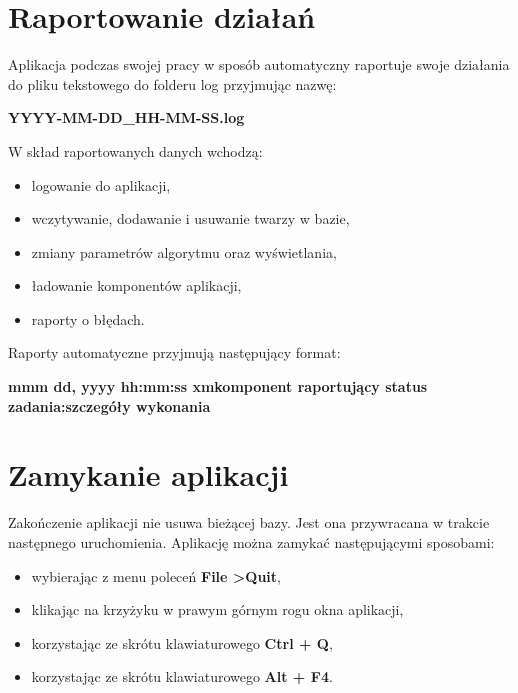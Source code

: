 \documentclass[]{article}
\begin{document}
\section[Logowanie]{Raportowanie działań}
Aplikacja podczas swojej pracy w sposób automatyczny raportuje swoje działania do pliku tekstowego do folderu log przyjmując nazwę:\newline
\begin{center}
\textbf{\lbrack YYYY-MM-DD\_HH-MM-SS\rbrack.log}\newline\end{center}
W skład raportowanych danych wchodzą:
\begin{itemize}
	\item logowanie do aplikacji,
	\item wczytywanie, dodawanie i usuwanie twarzy w bazie,
	\item zmiany parametrów algorytmu oraz wyświetlania,
	\item ładowanie komponentów aplikacji,
	\item raporty o błędach.
\end{itemize}
Raporty automatyczne przyjmują następujący format:
\begin{flushleft}
\textbf{\lbrack mmm dd, yyyy hh:mm:ss xm\rbrack\space\lbrack komponent raportujący\rbrack\newline
\lbrack status zadania\rbrack:\lbrack szczegóły wykonania\rbrack}
\end{flushleft}



\section[Zamykanie]{Zamykanie aplikacji}
Zakończenie aplikacji nie usuwa bieżącej bazy. Jest ona przywracana w trakcie następnego uruchomienia. Aplikację można zamykać następującymi sposobami:
\begin{itemize}
	\item wybierając z menu poleceń \textbf{File \textgreater \space Quit},
	\item klikając na krzyżyku w prawym górnym rogu okna aplikacji,
	\item korzystając ze skrótu klawiaturowego \textbf{Ctrl + Q},
	\item korzystając ze skrótu klawiaturowego \textbf{Alt + F4}.
\end{itemize}

\newpage
\tableofcontents
\end{document}
